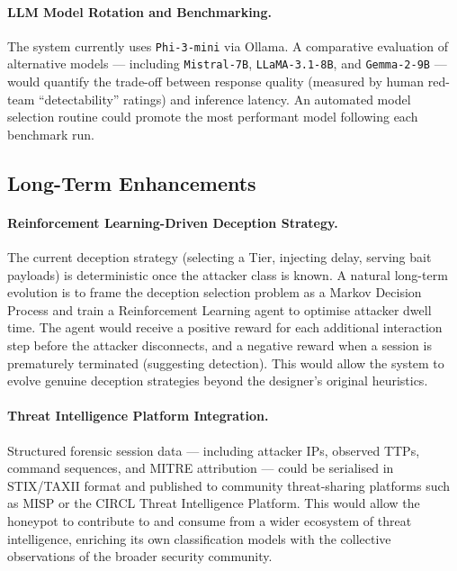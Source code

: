 \paragraph{LLM Model Rotation and Benchmarking.}
The system currently uses \texttt{Phi-3-mini} via Ollama. A comparative evaluation of alternative models — including \texttt{Mistral-7B}, \texttt{LLaMA-3.1-8B}, and \texttt{Gemma-2-9B} — would quantify the trade-off between response quality (measured by human red-team ``detectability'' ratings) and inference latency. An automated model selection routine could promote the most performant model following each benchmark run.

\subsection{Long-Term Enhancements}

\paragraph{Reinforcement Learning-Driven Deception Strategy.}
The current deception strategy (selecting a Tier, injecting delay, serving bait payloads) is deterministic once the attacker class is known. A natural long-term evolution is to frame the deception selection problem as a Markov Decision Process and train a Reinforcement Learning agent to optimise attacker dwell time. The agent would receive a positive reward for each additional interaction step before the attacker disconnects, and a negative reward when a session is prematurely terminated (suggesting detection). This would allow the system to evolve genuine deception strategies beyond the designer's original heuristics.

\paragraph{Threat Intelligence Platform Integration.}
Structured forensic session data — including attacker IPs, observed TTPs, command sequences, and MITRE attribution — could be serialised in STIX/TAXII format and published to community threat-sharing platforms such as MISP or the CIRCL Threat Intelligence Platform. This would allow the honeypot to contribute to and consume from a wider ecosystem of threat intelligence, enriching its own classification models with the collective observations of the broader security community.

